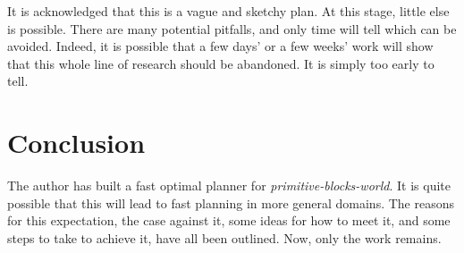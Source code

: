 \documentclass{article}
\newcommand{\sbw}{{\em primitive-blocks-world}}
\begin{document}
It is acknowledged that this is a vague and sketchy plan.  At this
stage, little else is possible.  There are many potential pitfalls,
and only time will tell which can be avoided.  Indeed, it is possible
that a few days' or a few weeks' work will show that this whole
line of research should be abandoned.  It is simply too early to tell.

\section{Conclusion}
\label{section-conclusion}

The author has built a fast optimal planner for \sbw{}.  It is quite
possible that this will lead to fast planning in more general domains.
The reasons for this expectation, the case against it, some ideas for
how to meet it, and some steps to take to achieve it, have all been
outlined.  Now, only the work remains.



\end{document}
